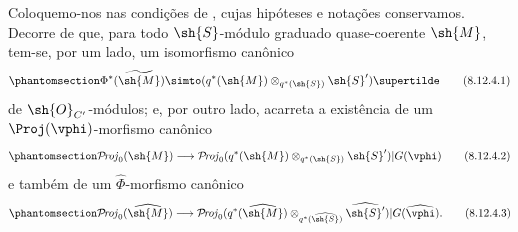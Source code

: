 \documentclass[oneside,10pt]{amsart}
\makeatletter
\newcommand{\ega@arrow}[2]{\mathchoice{#1}{#2}{#2}{#2}}
\renewcommand{\to}{\ega@arrow{\longrightarrow}{\rightarrow}}
\def\shProj{\mathcal{P}\!\mathit{roj}}
\let\EGAOriginalLabel\label
\renewcommand{\label}[1]{\phantomsection\EGAOriginalLabel{#1}}
\makeatother
\begin{document}
\begin{env}[8.12.4]
\label{II.8.12.4}
Coloquemo-nos nas condições de , cujas hipóteses e notações conservamos.
Decorre de  que, para todo $\sh{S}$-módulo graduado quase-coerente $\sh{M}$, tem-se, por um lado, um isomorfismo canônico
\[
\label{II.8.12.4.1}
  \Phi^*(\widetilde{\sh{M}})\simto(q^*(\sh{M})\otimes_{q^*(\sh{S})}\sh{S}')\supertilde
\tag{8.12.4.1}
\]
de $\sh{O}_{C'}$-módulos;
e, por outro lado,  acarreta a existência de um $\Proj(\vphi)$-morfismo canônico
\[
\label{II.8.12.4.2}
  \shProj_0(\sh{M})\to\shProj_0(q^*(\sh{M})\otimes_{q^*(\sh{S})}\sh{S}')|G(\vphi)
\tag{8.12.4.2}
\]
e também de um $\widehat{\Phi}$-morfismo canônico
\[
\label{II.8.12.4.3}
  \shProj_0(\widehat{\sh{M}})\to\shProj_0(q^*(\widehat{\sh{M}})\otimes_{q^*(\widehat{\sh{S}})}\widehat{\sh{S}'})|G(\widehat{\vphi}).
\tag{8.12.4.3}
\]
\end{env}
\end{document}
